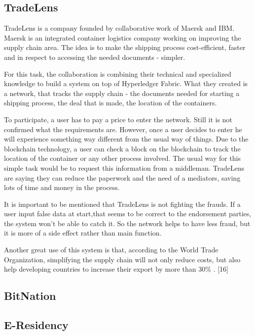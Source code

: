 \documentclass[a4paper,11pt]{report}
\begin{document}
\subsection{TradeLens}
\label{tradelens}

	TradeLens is a company founded by collaborative work of Maersk and IBM. Maersk is an integrated container logistics company working on improving the supply chain area. The idea is to make the shipping process cost-efficient, faster and in respect to accessing the needed documents - simpler.
	 
	For this task, the collaboration is combining their technical and specialized knowledge to build a system on top of Hyperledger Fabric. What they created is a network, that tracks the supply chain - the documents needed for starting a shipping process, the deal that is made, the location of the containers.
	 
	To participate, a user has to pay a price to enter the network. Still it is not confirmed what the requirements are. However, once a user decides to enter he will experience something way different from the usual way of things. Due to the blockchain technology, a user can check a block on the blockchain to track the location of the container or any other process involved. The usual way for this simple task would be to request this information from a middleman. TradeLens are saying they can reduce the paperwork and the need of a mediators, saving lots of time and money in the process. \cite{tradeLensFounders}
	
	It is important to be mentioned that TradeLens is not fighting the frauds. If a user input false data at start,that seems to be correct to the endorsement parties, the system won’t be able to catch it. So the network helps to have less fraud, but it is more of a side effect rather than main function.
	
	Another great use of this system is that, according to the World Trade Organization, simplifying the supply chain will not only reduce costs, but also help developing countries to increase their export by more than 30\% . [16]
	
\subsection{BitNation}
\label{bitnation}


\subsection{E-Residency}
\label{eResidency}
\end{document}
